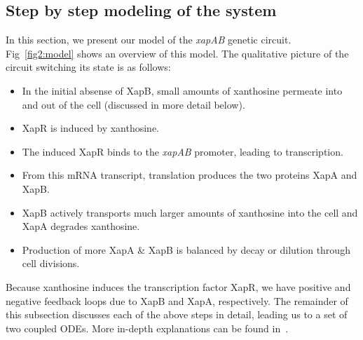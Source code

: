 \documentclass[10pt,letterpaper]{article}
\begin{document}
	\subsection*{Step by step modeling of the system}
	In this section, we present our model of the \emph{xapAB} genetic circuit.
	Fig~\ref{fig2:model} shows an overview of this model.
	The qualitative picture of the circuit switching its state is as follows:
	\begin{itemize}
		\item In the initial absense of XapB, small amounts of xanthosine permeate into and out of the cell (discussed in more detail below).
		\item XapR is induced by xanthosine.
		\item The induced XapR binds to the \emph{xapAB} promoter, leading to transcription.
		\item From this mRNA transcript, translation produces the two proteins XapA and XapB.
		\item XapB actively transports much larger amounts of xanthosine into the cell and XapA degrades xanthosine.
		\item Production of more XapA \& XapB is balanced by decay or dilution through cell divisions.
	\end{itemize}
	Because xanthosine induces the transcription factor XapR, we have positive
	and negative feedback loops due to XapB and XapA, respectively. The remainder
	of this subsection discusses each of the above steps in detail, leading us
	to a set of two coupled ODEs. More in-depth explanations can be found
	in~.
	
\end{document}
